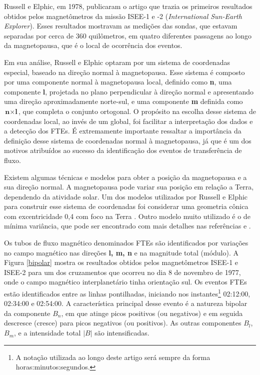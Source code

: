 Russell e Elphic, em 1978, publicaram o artigo \cite{elphic1978} que trazia os primeiros resultados obtidos pelos magnetômetros da missão ISEE-1 e -2 (\textit{International Sun-Earth Explorer}). Esses resultados mostravam as medições das sondas, que estavam separadas por cerca de 360 quilômetros, em quatro diferentes passagens ao longo da magnetopausa, que é o local de ocorrência dos eventos.

Em sua análise, Russell e Elphic optaram por um sistema de coordenadas especial, baseado na direção normal à magnetopausa. Esse sistema é composto por uma componente normal à magnetopausa local, definido como \textbf{n}, uma componente \textbf{l}, projetada no plano perpendicular à direção normal e apresentando uma direção aproximadamente norte-sul, e uma componente \textbf{m} definida como $\textbf{n}\times \textbf{l}$, que completa o conjunto ortogonal. O propósito na escolha desse sistema de coordenadas local, ao invés de um global, foi facilitar a interpretação dos dados e a detecção dos FTEs. É extremamente importante ressaltar a importância da definição desse sistema de coordenadas normal à magnetopausa, já que é um dos motivos atribuídos ao sucesso da identificação dos eventos de transferência de fluxo.

Existem algumas técnicas e modelos para obter a posição da magnetopausa e a sua direção normal. A magnetopausa pode variar sua posição em relação a Terra, dependendo da atividade solar. Um dos modelos utilizados por Russell e Elphic para construir esse sistema de coordenadas foi considerar uma geometria cônica com excentricidade 0,4 com foco na Terra \cite{elphic1978}. Outro modelo muito utilizado é o de mínima variância, que pode ser encontrado com mais detalhes nas referências \cite{sonnerup1967} e \cite{siscoe1968}. 

Os tubos de fluxo magnético denominados FTEs são identificados por variações no campo magnético nas direções \textbf{l, m, n} e na magnitude total (módulo). A Figura \ref{bipolar} mostra os resultados obtidos pelos magnetômetros ISEE-1 e ISEE-2 para um dos cruzamentos que ocorreu no dia 8 de novembro de 1977, onde o campo magnético interplanetário tinha orientação sul. Os eventos FTEs estão identificados entre as linhas pontilhadas, iniciando nos instantes\footnote{A notação utilizada ao longo deste artigo será sempre da forma horas:minutos:segundos.} 02:12:00, 02:34:00 e 02:54:00. A característica principal desse evento é a natureza bipolar da componente $B_n$, em que atinge picos positivos (ou negativos) e em seguida descresce (cresce) para picos negativos (ou positivos). As outras componentes $B_l$, $B_m$, e a intensidade total $|B|$ são intensificadas.   


